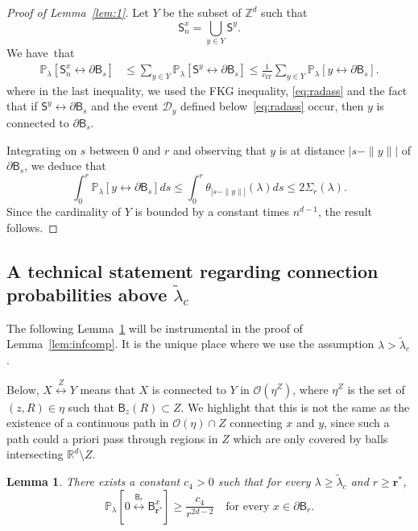 \documentclass[10pt]{amsart}
\newtheorem{lemm}[theo]{Lemma}\newtheorem{prop}[theo]{Proposition}\newtheorem{coro}[theo]{Corollary}\newtheorem{conj}[theo]{Conjecture}
\theoremstyle{definition}\newtheorem{defi}[theo]{Definition}\newtheorem{rema}[theo]{Remark}\newtheorem{exam}[theo]{Example}\newtheorem{exem}[theo]{Example}\newtheorem{nota}[theo]{Notation}
\newcommand{\rbf}{\mathbf{r}}
\DeclareMathOperator{\IT}{IT}
\begin{document}
\begin{proof}[Proof of Lemma~\ref{lem:1}]
Let $Y$ be the subset of ${\mathbb Z}^d$ such that
\[
\mathsf S^x_n=\bigcup_{y\in Y}\mathsf S^y.
\]
We have~that
\begin{align*}
{\mathbb P}_\lambda[\mathsf S^x_n\stackrel{}{\longleftrightarrow}\partial\mathsf B_s]&\le \sum_{y\in Y}{\mathbb P}_\lambda[\mathsf S^y\stackrel{}{\longleftrightarrow}\partial\mathsf B_s]\le \frac1{c_{\IT}}\sum_{y\in Y}{\mathbb P}_\lambda[y\stackrel{}{\longleftrightarrow}\partial\mathsf B_s].
\end{align*}
where in the last inequality, we used the FKG inequality, \eqref{eq:radass} and the fact that if $\mathsf S^y\stackrel{}{\longleftrightarrow}\partial\mathsf B_s$ and the event $\mathcal D_y$ defined below~\eqref{eq:radass} occur, then $y$ is connected to $\partial\mathsf B_s$.

Integrating on $s$ between $0$ and $r$ and observing that $y$ is at distance $|s-\|y\||$ of $\partial\mathsf B_s$, we deduce that
\[
\int_0^r{\mathbb P}_\lambda[y\stackrel{}{\longleftrightarrow}\partial\mathsf B_s]ds\le\int_0^r\theta_{|s-\|y\||}(\lambda)ds\le 2\Sigma_r(\lambda).
\]
Since the cardinality of $Y$ is bounded by a constant times $n^{d-1}$, the result follows.
\end{proof}


\subsection{A technical statement regarding connection probabilities above \texorpdfstring{$\widetilde\lambda_c$}{lambdac}}\label{subsec3.2}

The following Lemma~\ref{lem:tech} will be instrumental in the proof of Lemma~\ref{lem:infcomp}. It is the unique place where we use the assumption $\lambda>\widetilde\lambda_c$.

Below, $X\stackrel{Z}{\longleftrightarrow}Y$ means that $X$ is connected to $Y$ in ${\mathcal O}(\eta^Z)$, where $\eta^Z$ is the set of $(z,R)\in \eta$ such that $\mathsf B_z(R)\subset Z$. We highlight that this is not the same as the existence of a continuous path in ${\mathcal O}(\eta)\cap Z$ connecting $x$ and $y$, since such a path could a priori pass through regions in $Z$ which are only covered by balls intersecting ${\mathbb R}^d\setminus Z$.

\begin{lemm}\label{lem:tech}
There exists a constant $c_4>0$ such that for every $\lambda\ge \widetilde\lambda_c$ and $r\ge {\rbf^*}$,
\begin{equation}\label{eq:connect}
{\mathbb P}_\lambda \left[0 \stackrel{\mathsf B_r}{\longleftrightarrow} \mathsf B_{\rbf^*}^x \right] \geq \frac{c_4}{r^{2d - 2 }}\quad\text{for every } x\in\partial\mathsf B_r.
\end{equation}
\end{lemm}
\end{document}
